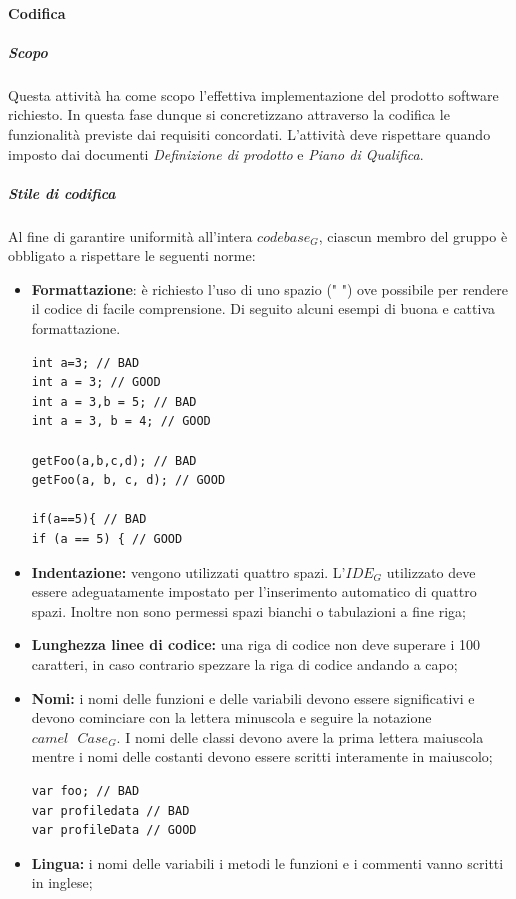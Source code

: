 		\paragraph{Codifica}
			\subparagraph{Scopo} \Spazio
			Questa attività ha come scopo l'effettiva implementazione del prodotto software richiesto. In questa fase dunque si concretizzano attraverso la codifica le funzionalità previste dai requisiti concordati.
			L'attività deve rispettare quando imposto dai documenti \textit{Definizione di prodotto} e \textit{Piano di Qualifica}.
			\subparagraph{Stile di codifica} \Spazio
			Al fine di garantire uniformità all'intera $codebase_G$, ciascun membro del gruppo è obbligato a rispettare le seguenti norme:
			\begin{itemize}
			\item \textbf{Formattazione}: è richiesto l'uso di uno spazio (" ") ove possibile per rendere il codice di facile comprensione.
			Di seguito alcuni  esempi di buona e cattiva formattazione.
\begin{lstlisting}
int a=3; // BAD
int a = 3; // GOOD
int a = 3,b = 5; // BAD
int a = 3, b = 4; // GOOD

getFoo(a,b,c,d); // BAD
getFoo(a, b, c, d); // GOOD

if(a==5){ // BAD
if (a == 5) { // GOOD
\end{lstlisting}
			
			\item \textbf{Indentazione:} vengono utilizzati quattro spazi. L'$IDE_G$ utilizzato deve essere adeguatamente impostato per l'inserimento automatico di quattro spazi. Inoltre non sono permessi spazi bianchi o tabulazioni a fine riga;
			
			\item \textbf{Lunghezza linee di codice:} una riga di codice non deve superare i 100 caratteri, in caso contrario spezzare la riga di codice andando a capo;
			
			\item \textbf{Nomi:} i nomi delle funzioni e delle variabili devono essere significativi e devono cominciare con la lettera minuscola e seguire la notazione $camel\textbf{ }Case_G$. I nomi delle classi devono avere la prima lettera maiuscola mentre i nomi delle costanti devono essere scritti interamente in maiuscolo;
\begin{lstlisting}
var foo; // BAD
var profiledata // BAD
var profileData // GOOD
\end{lstlisting}
			
			\item \textbf{Lingua:} i nomi delle variabili i metodi le funzioni e i commenti vanno scritti in inglese;
			

\end{itemize}
